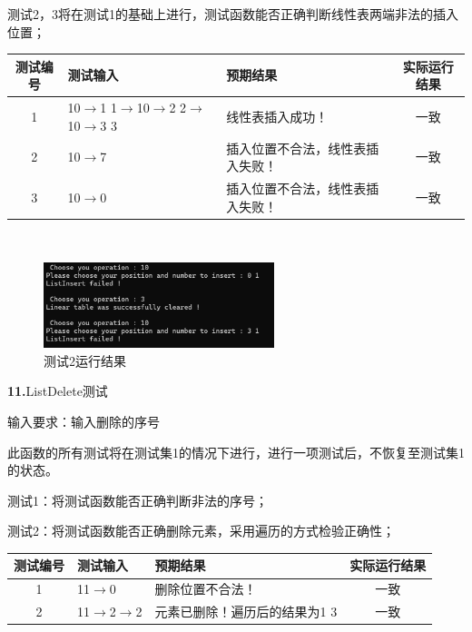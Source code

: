 \documentclass[supercite]{Experimental_Report}
\theoremstyle{definition}
\begin{document}
	测试2，3将在测试1的基础上进行，测试函数能否正确判断线性表两端非法的插入位置；

\vspace{0.5em}

\begin{tabular}{|c|p{2.8cm}|p{5cm}|c|}
	\hline
	测试编号 & 测试输入 & 预期结果 & 实际运行结果 \\
	\hline
	1 & 10$\rightarrow$1 1$\rightarrow$10$\rightarrow$2 2$\rightarrow$10$\rightarrow$3 3 & 线性表插入成功！ & 一致 \\
	\hline
	2 & 10$\rightarrow$7 & 插入位置不合法，线性表插入失败！ & 一致 \\
	\hline
	3 & 10$\rightarrow$0 & 插入位置不合法，线性表插入失败！ & 一致 \\
	\hline
\end{tabular}

~\

 \begin{figure}[H]
 	\centering
 	\includegraphics[width=0.6\textwidth]{images/线性表测试10.png}
 	\caption{测试2运行结果}
 	\label{txlab}
 \end{figure}


\noindent\textbf{11.}ListDelete测试

	输入要求：输入删除的序号

	此函数的所有测试将在测试集1的情况下进行，进行一项测试后，不恢复至测试集1的状态。

	测试1：将测试函数能否正确判断非法的序号；

	测试2：将测试函数能否正确删除元素，采用遍历的方式检验正确性；


\vspace{0.5em}

\begin{tabular}{|c|p{2.7cm}|p{4.5cm}|c|}
	\hline
	测试编号 & 测试输入 & 预期结果 & 实际运行结果 \\
	\hline
	1 & 11$\rightarrow$0 & 删除位置不合法！ & 一致 \\
	\hline
	2 & 11$\rightarrow$2$\rightarrow$2 & 元素已删除！遍历后的结果为1 3 & 一致 \\
	\hline
\end{tabular}

~\
\end{document}
